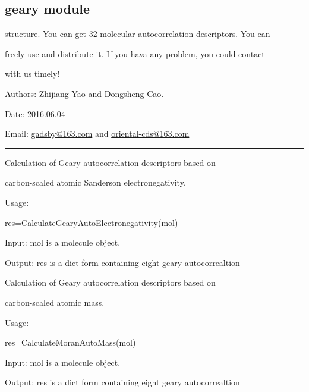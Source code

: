 \documentclass[letterpaper,10pt,english]{sphinxmanual}
\begin{document}
\subsection{geary module}
\label{reference/geary::doc}\label{reference/geary:module-geary}\label{reference/geary:geary-module}
structure. You can get 32 molecular autocorrelation descriptors. You can

freely use and distribute it. If you hava  any problem, you could contact

with us timely!

Authors: Zhijiang Yao and Dongsheng Cao.

Date: 2016.06.04

Email: \href{mailto:gadsby@163.com}{gadsby@163.com} and \href{mailto:oriental-cds@163.com}{oriental-cds@163.com}


\bigskip\hrule{}\bigskip


\begin{fulllineitems}
\label{reference/geary:geary.CalculateGearyAutoElectronegativity}
Calculation of Geary autocorrelation descriptors based on

carbon-scaled atomic Sanderson electronegativity.

Usage:

res=CalculateGearyAutoElectronegativity(mol)

Input: mol is a molecule object.

Output: res is a dict form containing eight geary autocorrealtion

\end{fulllineitems}


\begin{fulllineitems}
\label{reference/geary:geary.CalculateGearyAutoMass}
Calculation of Geary autocorrelation descriptors based on

carbon-scaled atomic mass.

Usage:

res=CalculateMoranAutoMass(mol)

Input: mol is a molecule object.

Output: res is a dict form containing eight geary autocorrealtion

\end{fulllineitems}
\end{document}
